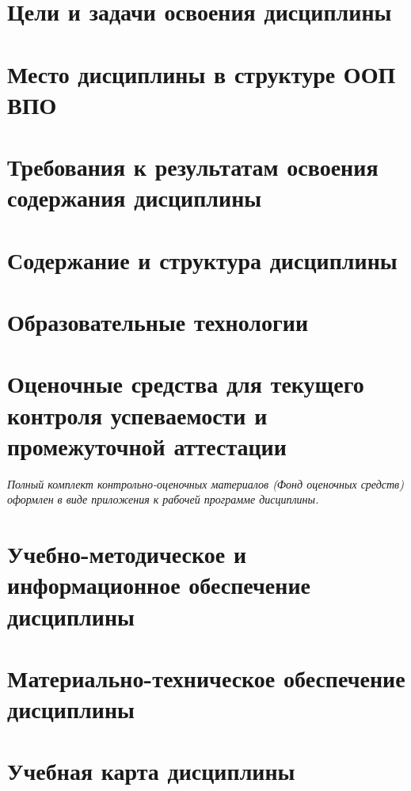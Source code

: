 






\section{Цели и задачи освоения дисциплины}


\section{Место дисциплины в структуре ООП ВПО}


\section{Требования к результатам освоения содержания дисциплины}


\section{Содержание и структура дисциплины}


\section{Образовательные технологии}



\section{Оценочные средства для текущего контроля успеваемости и промежуточной аттестации}

\emph{Полный комплект контрольно-оценочных материалов (Фонд оценочных средств) оформлен в виде приложения к рабочей программе дисциплины.}

\section{Учебно-методическое и информационное обеспечение дисциплины}


\section{Материально-техническое обеспечение дисциплины}

	

\clearpage
\section{Учебная карта дисциплины}

% 
% 


